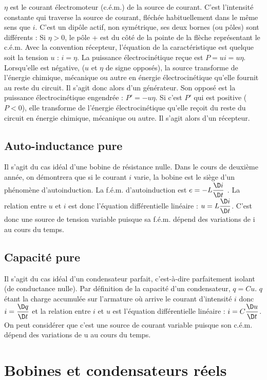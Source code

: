$\eta$ est le courant électromoteur (c.é.m.) de la source de courant. C'est l'intensité constante qui traverse la source de courant, fléchée habituellement dans le même sens que $i$.
C'est un dipôle actif, non symétrique, ses deux bornes (ou pôles) sont différents : Si $\eta > 0$, le pôle + est du côté de la pointe de la flèche représentant le c.é.m. Avec la convention récepteur, l'équation de la caractéristique est quelque soit la tension $u$ : $i=\eta$. La puissance électrocinétique reçue est $P  = u i = u \eta$. Lorsqu'elle est négative, ($u$ et $\eta$ de signe opposés), la source transforme de l'énergie chimique, mécanique ou autre en énergie électrocinétique qu'elle fournit au reste du circuit. Il s'agit donc alors d'un générateur. Son opposé est la puissance électrocinétique engendrée : $P' = -u\eta$. Si c'est $P'$ qui est positive ($P  < 0$), elle transforme de l'énergie électrocinétique qu'elle reçoit du reste du circuit en énergie chimique, mécanique ou autre. Il s'agit alors d'un récepteur.

\subsection{Auto-inductance pure}

Il s'agit du cas idéal d'une bobine de résistance nulle. Dans le cours de deuxième année, on démontrera que si le courant $i$ varie, la bobine est le siège d'un phénomène d'autoinduction. La f.é.m. d'autoinduction est $e = -L\derived{i}{t}$ . La relation entre $u$ et $i$ est donc l'équation différentielle linéaire : $u = L\derived{i}{t}$. C'est donc une source de tension variable puisque sa f.é.m. dépend des variations de i au cours du temps.

\subsection{Capacité pure}

Il s'agit du cas idéal d'un condensateur parfait, c'est-à-dire parfaitement isolant (de conductance nulle). Par définition de la capacité d'un condensateur, $q=Cu$. $q$ étant la charge accumulée sur l'armature où arrive le courant d'intensité $i$ donc $i = \derived{q}{t}$  et la relation entre $i$ et $u$ est l'équation différentielle linéaire : $i=C\derived{u}{t}$. On peut considérer que c'est une source de courant variable puisque son c.é.m. dépend des variations de u au cours du temps.

\section{Bobines et condensateurs réels}

